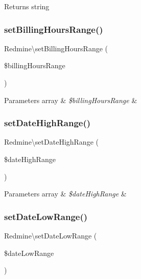 \begin{DoxyReturn}{Returns}
string 
\end{DoxyReturn}
\mbox{\label{namespace_redmine_afbc4a2cbda2d9fbad5b50c50052cc1d7}} 
\subsubsection{\texorpdfstring{set\+Billing\+Hours\+Range()}{setBillingHoursRange()}}
{\footnotesize\ttfamily Redmine\textbackslash{}set\+Billing\+Hours\+Range (\begin{DoxyParamCaption}\item[{}]{\$billing\+Hours\+Range }\end{DoxyParamCaption})}


\begin{DoxyParams}[1]{Parameters}
array & {\em \$billing\+Hours\+Range} & \\
\hline
\end{DoxyParams}
\mbox{\label{namespace_redmine_a1d899af81d907eb89afa797842fe7db3}} 
\subsubsection{\texorpdfstring{set\+Date\+High\+Range()}{setDateHighRange()}}
{\footnotesize\ttfamily Redmine\textbackslash{}set\+Date\+High\+Range (\begin{DoxyParamCaption}\item[{}]{\$date\+High\+Range }\end{DoxyParamCaption})}


\begin{DoxyParams}[1]{Parameters}
array & {\em \$date\+High\+Range} & \\
\hline
\end{DoxyParams}
\mbox{\label{namespace_redmine_a812c5158d9c81670071e1924a0d1ad2b}} 
\subsubsection{\texorpdfstring{set\+Date\+Low\+Range()}{setDateLowRange()}}
{\footnotesize\ttfamily Redmine\textbackslash{}set\+Date\+Low\+Range (\begin{DoxyParamCaption}\item[{}]{\$date\+Low\+Range }\end{DoxyParamCaption})}


